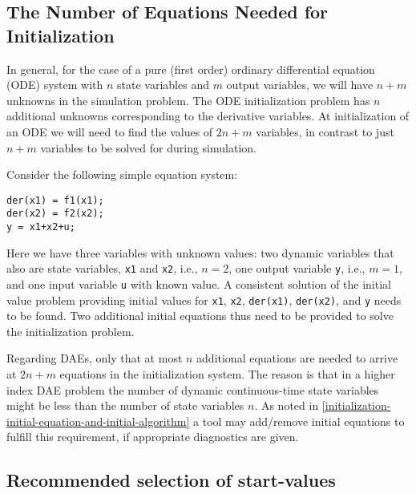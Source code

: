 \subsection{The Number of Equations Needed for Initialization}\label{the-number-of-equations-needed-for-initialization}

\begin{nonnormative}
In general, for the case of a pure (first order) ordinary
differential equation (ODE) system with $n$ state variables and $m$ output
variables, we will have $n+m$ unknowns in the simulation problem. The ODE
initialization problem has $n$ additional unknowns corresponding to the
derivative variables. At initialization of an ODE we will need to find
the values of $2n+m$ variables, in contrast to just $n+m$ variables to be
solved for during simulation.
\end{nonnormative}

\begin{example}
Consider the following simple equation system:
\begin{lstlisting}[language=modelica]
der(x1) = f1(x1);
der(x2) = f2(x2);
y = x1+x2+u;
\end{lstlisting}

Here we have three variables with unknown values: two dynamic
variables that also are state variables, \lstinline!x1! and \lstinline!x2!, i.e.,
$n=2$, one output variable \lstinline!y!, i.e., $m=1$, and one input variable \lstinline!u! with
known value. A consistent solution of the initial value problem
providing initial values for \lstinline!x1!, \lstinline!x2!, \lstinline!der(x1)!,
\lstinline!der(x2)!, and \lstinline!y! needs to be found. Two additional initial
equations thus need to be provided to solve the initialization problem.

Regarding DAEs, only that at most $n$ additional equations are
needed to arrive at $2n+m$ equations in the initialization system. The
reason is that in a higher index DAE problem the number of dynamic
continuous-time state variables might be less than the number of state
variables $n$. As noted in \cref{initialization-initial-equation-and-initial-algorithm} a tool may add/remove
initial equations to fulfill this requirement, if appropriate
diagnostics are given.
\end{example}

\subsection{Recommended selection of start-values}\label{recommended-selection-of-start-values}

